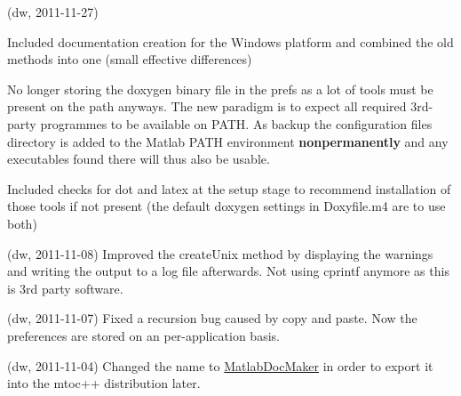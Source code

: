 
\begin{DoxyRefList}
\item[\label{changelog1_2__changelog1_2000001}%
\hypertarget{changelog1_2__changelog1_2000001}{}%
Class \hyperlink{class_matlab_doc_maker}{Matlab\+Doc\+Maker} ](dw, 2011-\/11-\/27)
\begin{DoxyItemize}
\item Included documentation creation for the Windows platform and combined the old methods into one (small effective differences)
\item No longer storing the doxygen binary file in the prefs as a lot of tools must be present on the path anyways. The new paradigm is to expect all required 3rd-\/party programmes to be available on P\+A\+TH. As backup the configuration files directory is added to the Matlab P\+A\+TH environment {\bfseries nonpermanently} and any executables found there will thus also be usable.
\item Included checks for {\ttfamily dot} and {\ttfamily latex} at the setup stage to recommend installation of those tools if not present (the default doxygen settings in Doxyfile.\+m4 are to use both)
\end{DoxyItemize}

(dw, 2011-\/11-\/08) Improved the create\+Unix method by displaying the warnings and writing the output to a log file afterwards. Not using cprintf anymore as this is 3rd party software.

(dw, 2011-\/11-\/07) Fixed a recursion bug caused by copy and paste. Now the preferences are stored on an per-\/application basis.

(dw, 2011-\/11-\/04) Changed the name to \hyperlink{class_matlab_doc_maker}{Matlab\+Doc\+Maker} in order to export it into the mtoc++ distribution later.
\end{DoxyRefList}
